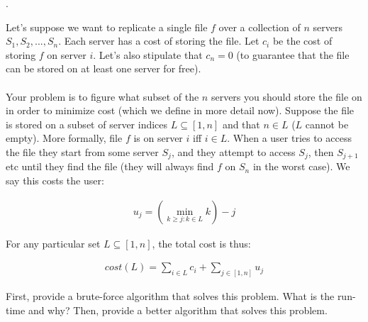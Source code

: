 \documentclass[12pt]{article}
\newcounter{quesnum}
\newcommand{\question}[2][??]{
\begin{list}{\labelitemi}{\leftmargin=2em}
\item [\arabic{quesnum}.] {} {#2}
\end{list}
\addtocounter{quesnum}{1}
}
\begin{document}
\question[3]{
Let's suppose we want to replicate a single file $f$ over a collection of $n$ servers $S_1,S_2,...,S_n$. Each server has a cost of storing the file. Let $c_i$ be the cost of storing $f$ on server $i$. Let's also stipulate that $c_n=0$ (to guarantee that the file can be stored on at least one server for free).\\
\\
Your problem is to figure what subset of the $n$ servers you should store the file on in order to minimize cost (which we define in more detail now). Suppose the file is stored on a subset of server indices $L \subseteq [1,n]$ and that $n \in L$ ($L$ cannot be empty). More formally, file $f$ is on server $i$ iff $i \in L$. When a user tries to access the file they start from some server $S_j$, and they attempt to access $S_j$, then $S_{j+1}$ etc until they find the file (they will always find $f$ on $S_n$ in the worst case). We say this costs the user:

\begin{align*}
u_j = \left( \min\limits_{k \geq j : k \in L} k \right) - j
\end{align*}

For any particular set $L \subseteq [1,n]$, the total cost is thus:

\begin{align*}
cost(L) = \sum\limits_{i \in L} c_i + \sum\limits_{j \in [1,n]} u_j
\end{align*}

First, provide a brute-force algorithm that solves this problem. What is the run-time and why? Then, provide a better algorithm that solves this problem.
}
\end{document}
